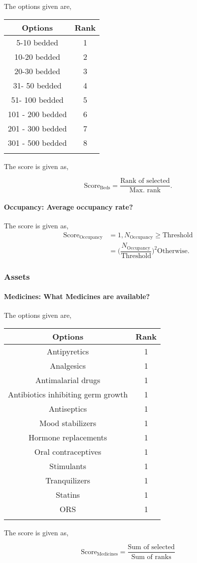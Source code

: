 \documentclass[oneside]{article}
\newcommand{\tsub}[2]{\text{#1}_{\text{#2}}}
\newcommand{\tsubb}[2]{#1_{\text{#2}}}
\newcommand{\dsub}[2]{\dfrac{\text{#1}}{\text{#2}}}
\newcommand{\multsel}[1]
{
	\[
		\tsub{Score}{#1} = \dsub{Sum of selected}{Sum of ranks}
	\]
}
\newcommand{\singsel}[1]
{
	\[
		\tsub{Score}{#1} = \dsub{Rank of selected}{Max. rank}.
	\]
}
\newenvironment{ttable}
{
\begin{center}
\begin{tabular}{c|c}
\hline
}
{
\\ \hline
\end{tabular}
\end{center}
}
\begin{document}
The options given are,
\begin{ttable}
Options & Rank \\ \hline
5-10 bedded & 1 \\
10-20 bedded & 2 \\
20-30 bedded & 3 \\
31- 50 bedded & 4 \\
51- 100 bedded & 5 \\
101 - 200 bedded & 6 \\
201 - 300 bedded & 7 \\
301 - 500 bedded & 8 \\
\hline
\end{ttable}
The score is given as,
\singsel{Beds}
\paragraph{Occupancy: Average occupancy rate?}

The score is given as,
\begin{align*}
\tsub{Score}{Occupancy} &= 1, \tsubb{N}{Occupancy} \ge \text{Threshold} \\
        &=
\Big(\dfrac{\tsubb{N}{Occupancy}}{\text{Threshold}}\Big)^{2}
\text{Otherwise}.
\end{align*}
\subsubsection{Assets}

\paragraph{Medicines: What Medicines are available?}

The options given are,
\begin{ttable}
Options & Rank \\ \hline
Antipyretics & 1 \\
Analgesics & 1 \\
Antimalarial drugs & 1 \\
Antibiotics inhibiting germ growth & 1 \\
Antiseptics & 1 \\
Mood stabilizers & 1 \\
Hormone replacements & 1 \\
Oral contraceptives & 1 \\
Stimulants & 1 \\
Tranquilizers & 1 \\
Statins & 1 \\
ORS & 1 \\
\hline
\end{ttable}
The score is given as,
\multsel{Medicines}
\end{document}

